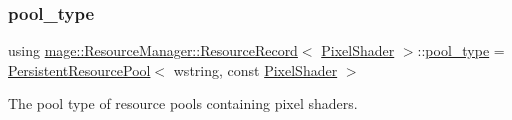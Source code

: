 \subsubsection{\texorpdfstring{pool\+\_\+type}{pool\_type}}
{\footnotesize\ttfamily using \hyperlink{structmage_1_1_resource_manager_1_1_resource_record}{mage\+::\+Resource\+Manager\+::\+Resource\+Record}$<$ \hyperlink{namespacemage_a27ecaf266420ee7a494d64edc0757129}{Pixel\+Shader} $>$\+::\hyperlink{structmage_1_1_resource_manager_1_1_resource_record_3_01_pixel_shader_01_4_abf3ea4911425542202c6f283c06ecc7e}{pool\+\_\+type} =  \hyperlink{classmage_1_1_persistent_resource_pool}{Persistent\+Resource\+Pool}$<$ wstring, const \hyperlink{namespacemage_a27ecaf266420ee7a494d64edc0757129}{Pixel\+Shader} $>$}

The pool type of resource pools containing pixel shaders. 